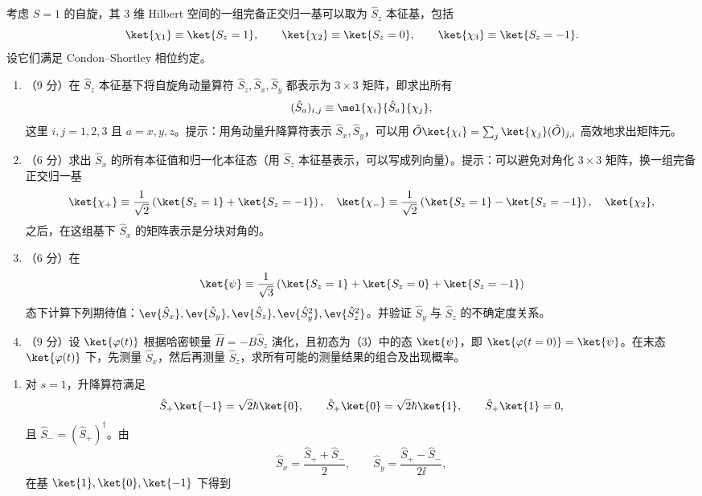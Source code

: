 \begin{question}[共 30 分]
考虑 $S=1$ 的自旋，其 $3$ 维 Hilbert 空间的一组完备正交归一基可以取为 $\hat S_z$ 本征基，包括
\[
\ket{\chi_1}\equiv\ket{S_z=1},\qquad
\ket{\chi_2}\equiv\ket{S_z=0},\qquad
\ket{\chi_3}\equiv\ket{S_z=-1}.
\]
设它们满足 Condon--Shortley 相位约定。
\begin{enumerate}
  \item （9 分）在 $\hat S_z$ 本征基下将自旋角动量算符 $\hat S_z,\hat S_x,\hat S_y$ 都表示为 $3\times3$ 矩阵，即求出所有
  \[
  (\hat S_a)_{i,j}\equiv\mel{\chi_i}{\hat S_a}{\chi_j},
  \]
  这里 $i,j=1,2,3$ 且 $a=x,y,z$。提示：用角动量升降算符表示 $\hat S_x,\hat S_y$，可以用 $\hat O\ket{\chi_i}=\sum_j\ket{\chi_j}(\hat O)_{j,i}$ 高效地求出矩阵元。
  \item （6 分）求出 $\hat S_x$ 的所有本征值和归一化本征态（用 $\hat S_z$ 本征基表示，可以写成列向量）。提示：可以避免对角化 $3\times3$ 矩阵，换一组完备正交归一基
  \[
  \ket{\chi_+}\equiv\frac{1}{\sqrt2}\left(\ket{S_z=1}+\ket{S_z=-1}\right),\quad
  \ket{\chi_-}\equiv\frac{1}{\sqrt2}\left(\ket{S_z=1}-\ket{S_z=-1}\right),\quad
  \ket{\chi_2},
  \]
  之后，在这组基下 $\hat S_x$ 的矩阵表示是分块对角的。
  \item （6 分）在
  \[
  \ket{\psi}\equiv\frac{1}{\sqrt3}\left(\ket{S_z=1}+\ket{S_z=0}+\ket{S_z=-1}\right)
  \]
  态下计算下列期待值：$\ev{\hat S_x},\ev{\hat S_y},\ev{\hat S_z},\ev{\hat S_y^2},\ev{\hat S_z^2}$。并验证 $\hat S_y$ 与 $\hat S_z$ 的不确定度关系。
  \item （9 分）设 $\ket{\varphi(t)}$ 根据哈密顿量 $\hat H=-B\hat S_z$ 演化，且初态为（3）中的态 $\ket{\psi}$，即 $\ket{\varphi(t=0)}=\ket{\psi}$。在末态 $\ket{\varphi(t)}$ 下，先测量 $\hat S_x$，然后再测量 $\hat S_z$，求所有可能的测量结果的组合及出现概率。
\end{enumerate}
\begin{solution}
\begin{enumerate}
  \item 对 $s=1$，升降算符满足
  \[
  \hat S_+\ket{-1}=\sqrt2\hbar\ket{0},
  \qquad
  \hat S_+\ket{0}=\sqrt2\hbar\ket{1},
  \qquad
  \hat S_+\ket{1}=0,
  \]
  且 $\hat S_-=(\hat S_+)^\dagger$。由
  \[
  \hat S_x=\frac{\hat S_++\hat S_-}{2},
  \qquad
  \hat S_y=\frac{\hat S_+-\hat S_-}{2\ii},
  \]
  在基 $\ket{1},\ket{0},\ket{-1}$ 下得到
\end{enumerate}
\end{solution}
\end{question}
